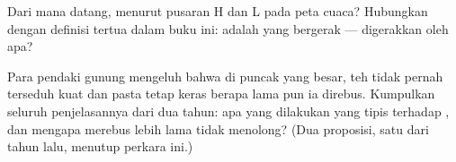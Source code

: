 \begin{exercise}[$\star\star$]\label{exo:g5:air-pressure-weather:10}
Dari mana  datang, menurut pusaran H dan L pada peta cuaca?
Hubungkan dengan definisi tertua dalam buku ini:  adalah 
yang bergerak --- digerakkan oleh apa?
\end{exercise}

\begin{exercise}[$\star\star$]\label{exo:g5:air-pressure-weather:11}
Para pendaki gunung mengeluh bahwa di puncak yang besar, teh tidak
pernah terseduh kuat dan pasta tetap keras berapa lama pun ia direbus.
Kumpulkan seluruh penjelasannya dari dua tahun: apa yang dilakukan
 yang tipis terhadap , dan mengapa merebus lebih
lama tidak menolong? (Dua proposisi, satu dari tahun lalu, menutup
perkara ini.)
\end{exercise}
